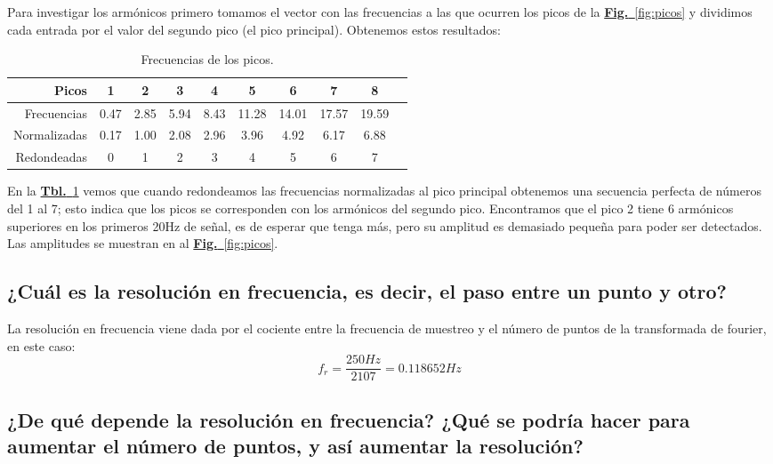 \documentclass{article}
\begin{document}
Para investigar los armónicos primero tomamos el vector con las
frecuencias a las que ocurren los picos de la
\hyperref[fig:picos]{\textbf{Fig.}~\ref*{fig:picos}} y dividimos cada
entrada por el valor del segundo pico (el pico principal). Obtenemos
estos resultados:

\begin{table}[h!]
\centering
\begin{tabular}{|r|c|c|c|c|c|c|c|c|c|}
\hline
\textbf{Picos} & \textbf{1} & \textbf{2} & \textbf{3} & \textbf{4} &
	\textbf{5} & \textbf{6} & \textbf{7} & \textbf{8}\\\hline
Frecuencias & 0.47 & 2.85 & 5.94 & 8.43 & 11.28 & 14.01 & 17.57 & 19.59\\\hline
Normalizadas & 0.17 & 1.00 & 2.08 & 2.96 & 3.96 & 4.92 & 6.17 & 6.88\\\hline
Redondeadas  & 0 & 1 & 2 & 3 & 4 & 5 & 6 & 7\\\hline
\end{tabular}
\caption{Frecuencias de los picos.}
\label{table:fcs}
\end{table}
\newpage
En la \hyperref[table:fcs]{\textbf{Tbl.}~\ref*{table:fcs}} vemos que
cuando redondeamos las frecuencias normalizadas al pico principal
obtenemos una secuencia perfecta de números del 1 al 7; esto indica
que los picos se corresponden con los armónicos del segundo pico.
Encontramos que el pico 2 tiene 6 armónicos superiores en los primeros
20Hz de señal, es de esperar que tenga más, pero su amplitud es
demasiado pequeña para poder ser detectados. Las amplitudes se
muestran en al \hyperref[fig:picos]{\textbf{Fig.}~\ref*{fig:picos}}.

\subsection{¿Cuál es la resolución en frecuencia, es decir, el paso entre un punto y otro?}

La resolución en frecuencia viene dada por el cociente entre la
frecuencia de muestreo y el número de puntos de la transformada de
fourier, en este caso:
\begin{equation}
f_{r} = \dfrac{250 Hz}{2107} = 0.118652 Hz
\end{equation}

\subsection{¿De  qué  depende  la  resolución  en  frecuencia? ¿Qué  se  podría  hacer  para aumentar el número de puntos, y así aumentar la resolución?}
\end{document}
